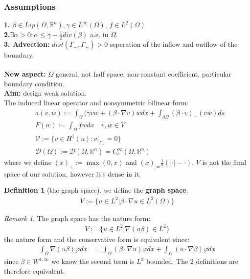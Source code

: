 \documentclass[a4paper,11pt,oneside,fleqn]{book}
\theoremstyle{definition}
\newtheorem{definition}{Definition}[section]
\theoremstyle{remark}
\newtheorem*{remark}{Remark}
\begin{document}
\subsubsection*{Assumptions}
\textbf{1.} $\beta \in Lip(\Omega, \mathbb{R}^n), \gamma \in L^\infty(\Omega)$, $f \in L^2(\Omega)$\\
\textbf{2.}$\exists \alpha > 0: \alpha \le \gamma - \frac{1}{2} div (\beta)$ a.e. in $\Omega$. \\
\textbf{3. Advection: } $dist(\Gamma_-, \Gamma_+ )> 0$ seperation of the inflow and outflow of the boundary. \\


\quad\\
\textbf{New aspect:} $\Omega$ general, not half space, non-constant coefficient, particular boundary condition. \\
\textbf{Aim:} design weak solution. \\
The induced linear operator and nonsymmetric bilinear form:
\begin{align*}
		&a(v,w) := \int_\Omega (\gamma v w + (\beta \cdot \nabla v)w dx + \int_{\partial\Omega}(\beta \cdot v)_- (v w)   ds\\
		&F(w) := \int_\Omega fw dx  \quad v, w \in V \\
	&\mathcal{V} := \{v \in H^1(u) : v|_{\Gamma_-} = 0\}\\
	&\mathcal{D}(\Omega) := \mathcal{D}(\Omega, \mathbb{R}^n) = C^\infty_c(\Omega, \mathbb{R}^n) 
\end{align*}
where we define $(x)_+:= \max(0, x)$ and $(x)_:= \frac{1}{2}(|\cdot| - \cdot)$.  $V$ is not the final space of our solution, however it's dense in it.

\begin{definition}[the graph space]
	we define the \textbf{graph space}:
	\begin{align*}
		V:= \{ u \in L^2| \beta \cdot \nabla u \in L^2(\Omega)\}
	\end{align*} 
\end{definition}
\begin{remark}
The graph space has the nature form:
\begin{align*}
	V:= \{ u \in L^2| \nabla( u \beta) \in L^2 \}
\end{align*}	
the nature form and the conservative form is equivalent since:
\begin{align*}
	\int_{\Omega} \nabla (u \beta) \varphi dx &= \int_{\Omega}  (\beta \cdot \nabla u)\varphi dx + \int_\Omega (u \cdot \nabla \beta) \varphi dx
\end{align*}
since $\beta \in W^{1, \infty}$ we know the second term is $L^2$ bounded. The 2 definitions are therefore equivalent.
\end{remark}
\end{document}
